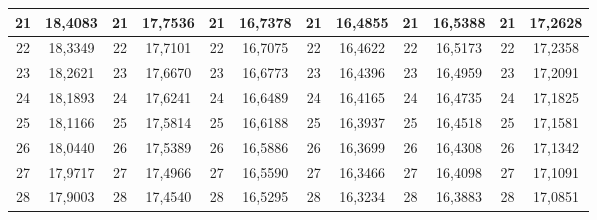\documentclass[a4paper,12pt]{article} %
\begin{document}
\begin{longtable}[c]{cccccccccc|c|c|}
	\multicolumn{1}{|c|}{21} & \multicolumn{1}{c|}{18,4083} & \multicolumn{1}{c|}{21} & \multicolumn{1}{c|}{17,7536} & \multicolumn{1}{c|}{21} & \multicolumn{1}{c|}{16,7378} & \multicolumn{1}{c|}{21} & \multicolumn{1}{c|}{16,4855} & \multicolumn{1}{c|}{21} & 16,5388 & 21 & 17,2628 \\ \hline
	\multicolumn{1}{|c|}{22} & \multicolumn{1}{c|}{18,3349} & \multicolumn{1}{c|}{22} & \multicolumn{1}{c|}{17,7101} & \multicolumn{1}{c|}{22} & \multicolumn{1}{c|}{16,7075} & \multicolumn{1}{c|}{22} & \multicolumn{1}{c|}{16,4622} & \multicolumn{1}{c|}{22} & 16,5173 & 22 & 17,2358 \\ \hline
	\multicolumn{1}{|c|}{23} & \multicolumn{1}{c|}{18,2621} & \multicolumn{1}{c|}{23} & \multicolumn{1}{c|}{17,6670} & \multicolumn{1}{c|}{23} & \multicolumn{1}{c|}{16,6773} & \multicolumn{1}{c|}{23} & \multicolumn{1}{c|}{16,4396} & \multicolumn{1}{c|}{23} & 16,4959 & 23 & 17,2091 \\ \hline
	\multicolumn{1}{|c|}{24} & \multicolumn{1}{c|}{18,1893} & \multicolumn{1}{c|}{24} & \multicolumn{1}{c|}{17,6241} & \multicolumn{1}{c|}{24} & \multicolumn{1}{c|}{16,6489} & \multicolumn{1}{c|}{24} & \multicolumn{1}{c|}{16,4165} & \multicolumn{1}{c|}{24} & 16,4735 & 24 & 17,1825 \\ \hline
	\multicolumn{1}{|c|}{25} & \multicolumn{1}{c|}{18,1166} & \multicolumn{1}{c|}{25} & \multicolumn{1}{c|}{17,5814} & \multicolumn{1}{c|}{25} & \multicolumn{1}{c|}{16,6188} & \multicolumn{1}{c|}{25} & \multicolumn{1}{c|}{16,3937} & \multicolumn{1}{c|}{25} & 16,4518 & 25 & 17,1581 \\ \hline
	\multicolumn{1}{|c|}{26} & \multicolumn{1}{c|}{18,0440} & \multicolumn{1}{c|}{26} & \multicolumn{1}{c|}{17,5389} & \multicolumn{1}{c|}{26} & \multicolumn{1}{c|}{16,5886} & \multicolumn{1}{c|}{26} & \multicolumn{1}{c|}{16,3699} & \multicolumn{1}{c|}{26} & 16,4308 & 26 & 17,1342 \\ \hline
	\multicolumn{1}{|c|}{27} & \multicolumn{1}{c|}{17,9717} & \multicolumn{1}{c|}{27} & \multicolumn{1}{c|}{17,4966} & \multicolumn{1}{c|}{27} & \multicolumn{1}{c|}{16,5590} & \multicolumn{1}{c|}{27} & \multicolumn{1}{c|}{16,3466} & \multicolumn{1}{c|}{27} & 16,4098 & 27 & 17,1091 \\ \hline
	\multicolumn{1}{|c|}{28} & \multicolumn{1}{c|}{17,9003} & \multicolumn{1}{c|}{28} & \multicolumn{1}{c|}{17,4540} & \multicolumn{1}{c|}{28} & \multicolumn{1}{c|}{16,5295} & \multicolumn{1}{c|}{28} & \multicolumn{1}{c|}{16,3234} & \multicolumn{1}{c|}{28} & 16,3883 & 28 & 17,0851 \\ \hline

\end{longtable}
\end{document}
